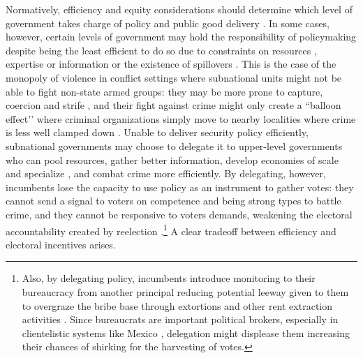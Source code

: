 \documentclass[12pt]{amsart}
\numberwithin{equation}{section}
\theoremstyle{definition}
\theoremstyle{definition}
\theoremstyle{definition}
\begin{document}
       
Normatively, efficiency and equity considerations should determine which level of government takes charge of policy and public good delivery \citep{oates_1972, Musgrave_1959, Musgrave_1983, gramlich_1977}. In some cases, however, certain levels of government may hold the responsibility of policymaking despite being the least efficient to do so due to constraints on resources \citep{Moravcsik_2000}, expertise or information \citep{Rodrick_1996} or the existence of spillovers \citep{oates_1972,  Besley_case_1995}. This is the case of the monopoly of violence in conflict settings where subnational units might not be able to fight non-state armed groups: they may be more prone to capture, coercion and strife \citep{chacon_2018}, and their fight against crime might only create a ``balloon effect’’ where criminal organizations simply move to nearby localities where crime is less well clamped down \citep{shirk_wallman_2015}. Unable to deliver security policy efficiently, subnational governments may choose to delegate it to upper-level governments who can pool resources, gather better information, develop economies of scale and specialize \citep{Hawkins_etal_2006}, and combat crime more efficiently. By delegating, however, incumbents lose the capacity to use policy as an instrument to gather votes: they cannot send a signal to voters on competence and being strong types to battle crime, and they cannot be responsive to voters demands, weakening the electoral accountability created by reelection \citep{cox_katz_2002}.\footnote{Also, by delegating policy, incumbents introduce monitoring to their bureaucracy from another principal reducing potential leeway given to them to overgraze the bribe base through extortions and other rent extraction activities \citep{schleifer_vishny_1993}. Since bureaucrats are important political brokers, especially in clientelistic systems like Mexico \citep{larreguy_etal_2017}, delegation might displease them increasing their chances of shirking for the harvesting of votes.} A clear tradeoff between efficiency and electoral incentives arises.    
     
\end{document}
